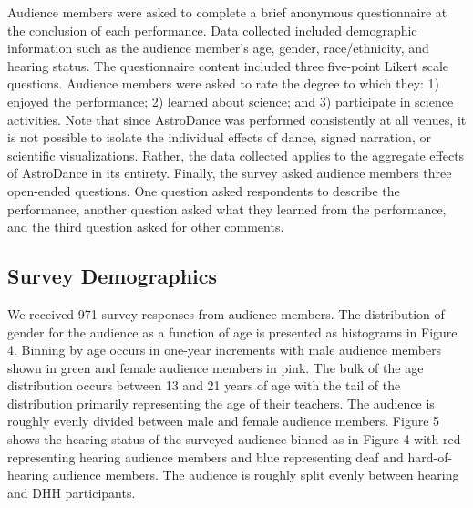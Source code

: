 \documentclass[11.5pt]{sig-alternate} %
\begin{document}
\begin{large}
Audience members were asked to complete a brief anonymous questionnaire at the conclusion of each performance.  Data collected included demographic information such as the audience member's age, gender, race/ethnicity, and hearing status.  The questionnaire content included three five-point Likert scale questions.  Audience members were asked to rate the degree to which they: 1) enjoyed the performance; 2) learned about science; and 3) participate in science activities.  Note that since AstroDance was performed consistently at all venues, it is not possible to isolate the individual effects of dance, signed narration, or scientific visualizations.  Rather, the data collected applies to the aggregate effects of AstroDance in its entirety.  Finally, the survey asked audience members three open-ended questions.  One question asked respondents to describe the performance, another question asked what they learned from the performance, and the third question asked for other comments.

\subsection*{Survey Demographics}

We received 971 survey responses from audience members.  The distribution of gender for the audience as a function of age is presented as histograms in Figure 4.  Binning by age occurs in one-year increments with male audience members shown in green and female audience members in pink.  The bulk of the age distribution occurs between 13 and 21 years of age with the tail of the distribution primarily representing the age of their teachers.  The audience is roughly evenly divided between male and female audience members.  Figure 5 shows the hearing status of the surveyed audience binned as in Figure 4 with red representing hearing audience members and blue representing deaf and hard-of-hearing audience members.  The audience is roughly split evenly between hearing and DHH participants.


\end{large}
\end{document}
